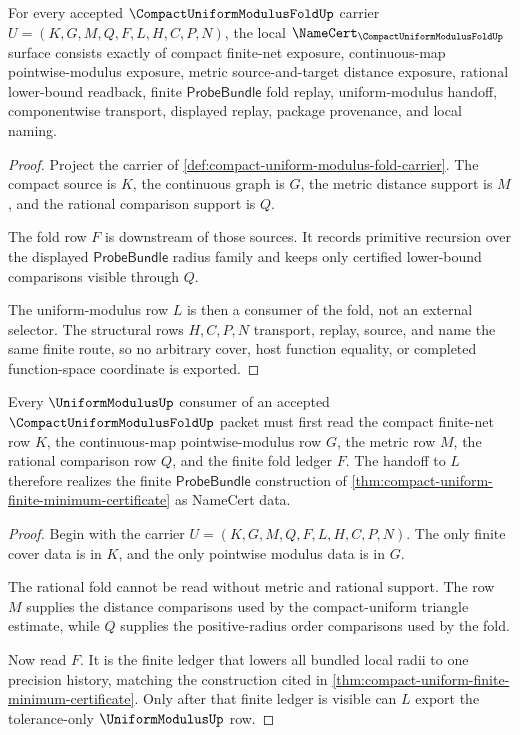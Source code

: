 \begin{theorem}
\label{thm:compact-uniform-modulus-fold-namecert-obligations}
For every accepted $\CompactUniformModulusFoldUp$ carrier $U=(K,G,M,Q,F,L,H,C,P,N)$, the local $\NameCert_{\CompactUniformModulusFoldUp}$ surface consists exactly of compact finite-net exposure, continuous-map pointwise-modulus exposure, metric source-and-target distance exposure, rational lower-bound readback, finite $\mathsf{ProbeBundle}$ fold replay, uniform-modulus handoff, componentwise transport, displayed replay, package provenance, and local naming.
\end{theorem}
\begin{proof}
Project the carrier of \autoref{def:compact-uniform-modulus-fold-carrier}. The compact source is $K$, the continuous graph is $G$, the metric distance support is $M$, and the rational comparison support is $Q$.

The fold row $F$ is downstream of those sources. It records primitive recursion over the displayed $\mathsf{ProbeBundle}$ radius family and keeps only certified lower-bound comparisons visible through $Q$.

The uniform-modulus row $L$ is then a consumer of the fold, not an external selector. The structural rows $H,C,P,N$ transport, replay, source, and name the same finite route, so no arbitrary cover, host function equality, or completed function-space coordinate is exported.
\end{proof}

\begin{theorem}
\label{thm:compact-uniform-modulus-fold-handoff}
Every $\UniformModulusUp$ consumer of an accepted $\CompactUniformModulusFoldUp$ packet must first read the compact finite-net row $K$, the continuous-map pointwise-modulus row $G$, the metric row $M$, the rational comparison row $Q$, and the finite fold ledger $F$. The handoff to $L$ therefore realizes the finite $\mathsf{ProbeBundle}$ construction of \autoref{thm:compact-uniform-finite-minimum-certificate} as NameCert data.
\end{theorem}
\begin{proof}
Begin with the carrier $U=(K,G,M,Q,F,L,H,C,P,N)$. The only finite cover data is in $K$, and the only pointwise modulus data is in $G$.

The rational fold cannot be read without metric and rational support. The row $M$ supplies the distance comparisons used by the compact-uniform triangle estimate, while $Q$ supplies the positive-radius order comparisons used by the fold.

Now read $F$. It is the finite ledger that lowers all bundled local radii to one precision history, matching the construction cited in \autoref{thm:compact-uniform-finite-minimum-certificate}. Only after that finite ledger is visible can $L$ export the tolerance-only $\UniformModulusUp$ row.
\end{proof}

